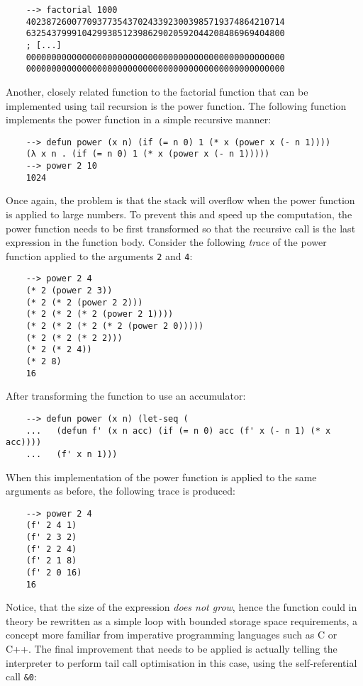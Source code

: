\begin{Verbatim}
    --> factorial 1000
    402387260077093773543702433923003985719374864210714
    632543799910429938512398629020592044208486969404800
    ; [...]
    000000000000000000000000000000000000000000000000000
    000000000000000000000000000000000000000000000000000
\end{Verbatim}

Another, closely related function to the factorial function that can be implemented using tail recursion is the power function. The following function implements the power function in a simple recursive manner:

\begin{Verbatim}
    --> defun power (x n) (if (= n 0) 1 (* x (power x (- n 1))))
    (λ x n . (if (= n 0) 1 (* x (power x (- n 1)))))
    --> power 2 10
    1024
\end{Verbatim}

Once again, the problem is that the stack will overflow when the power function is applied to large numbers. To prevent this and speed up the computation, the power function needs to be first transformed so that the recursive call is the last expression in the function body. Consider the following \textit{trace} of the power function applied to the arguments \verb|2| and \verb|4|:

\begin{Verbatim}
    --> power 2 4
    (* 2 (power 2 3))
    (* 2 (* 2 (power 2 2)))
    (* 2 (* 2 (* 2 (power 2 1))))
    (* 2 (* 2 (* 2 (* 2 (power 2 0)))))
    (* 2 (* 2 (* 2 2)))
    (* 2 (* 2 4))
    (* 2 8)
    16
\end{Verbatim}

After transforming the function to use an accumulator:

\begin{Verbatim}
    --> defun power (x n) (let-seq (
    ...   (defun f' (x n acc) (if (= n 0) acc (f' x (- n 1) (* x acc))))
    ...   (f' x n 1)))
\end{Verbatim}

When this implementation of the power function is applied to the same arguments as before, the following trace is produced:

\begin{Verbatim}
    --> power 2 4
    (f' 2 4 1)
    (f' 2 3 2)
    (f' 2 2 4)
    (f' 2 1 8)
    (f' 2 0 16)
    16
\end{Verbatim}

Notice, that the size of the expression \textit{does not grow}, hence the function could in theory be rewritten as a simple loop with bounded storage space requirements, a concept more familiar from imperative programming languages such as C or C++. The final improvement that needs to be applied is actually telling the interpreter to perform tail call optimisation in this case, using the self-referential call \verb|&0|:

